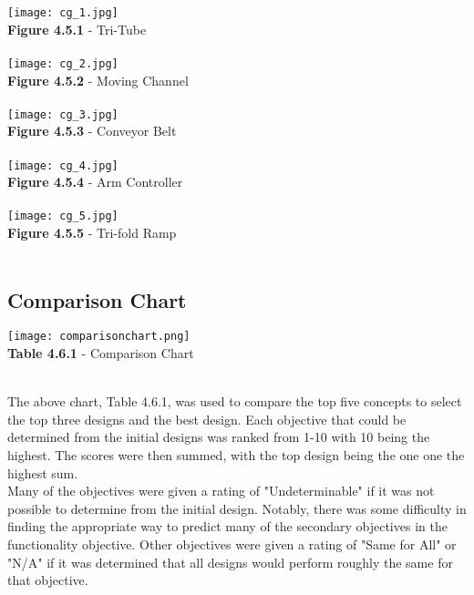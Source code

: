 \documentclass{article}
\begin{document}
\begin{center}
    \texttt{[image: cg\_1.jpg]}\\
    \small{\textbf{Figure 4.5.1} - Tri-Tube}\\~\\
    
    \texttt{[image: cg\_2.jpg]}\\
    \small{\textbf{Figure 4.5.2} - Moving Channel}\\~\\
    
    \texttt{[image: cg\_3.jpg]}\\
    \small{\textbf{Figure 4.5.3} - Conveyor Belt}\\~\\
    
    \texttt{[image: cg\_4.jpg]}\\
    \small{\textbf{Figure 4.5.4} - Arm Controller}\\~\\
    
    \texttt{[image: cg\_5.jpg]}\\
    \small{\textbf{Figure 4.5.5} - Tri-fold Ramp}\\~\\
    
\end{center}

\subsection{Comparison Chart}

\begin{center}
        \texttt{[image: comparisonchart.png]}\\
    \small{\textbf{Table 4.6.1} - Comparison Chart}\\~\\
\end{center}

The above chart, Table 4.6.1, was used to compare the top five concepts to select the top three designs and the best design. Each objective that could be determined from the initial designs was ranked from 1-10 with 10 being the highest. The scores were then summed, with the top design being the one one the highest sum. \\
Many of the objectives were given a rating of "Undeterminable" if it was not possible to determine from the initial design. Notably, there was some difficulty in finding the appropriate way to predict many of the secondary objectives in the functionality objective. Other objectives were given a rating of "Same for All" or "N/A" if it was determined that all designs would perform roughly the same for that objective.
\end{document}
